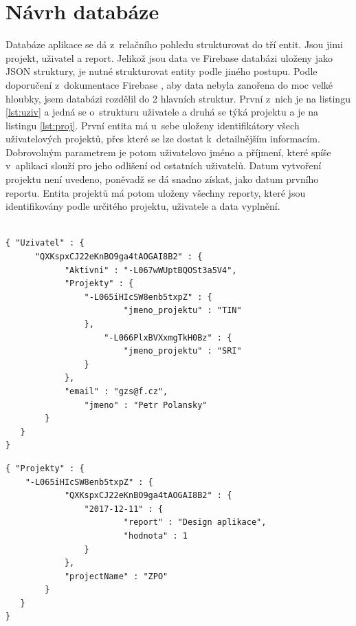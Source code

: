 \section{Návrh databáze}

Databáze aplikace se dá z~relačního pohledu strukturovat do tří entit. Jsou jimi projekt, uživatel a report. Jelikož jsou data ve Firebase databázi uloženy jako JSON struktury, je nutné strukturovat entity podle jiného postupu. Podle doporučení z~dokumentace Firebase \cite{firebase}, aby data nebyla zanořena do moc velké hloubky, jsem databázi rozdělil do 2 hlavních struktur. První z~nich je na listingu \ref{lst:uziv} a jedná se o~strukturu uživatele a druhá se týká projektu a je na listingu \ref{lst:proj}. První entita má u~sebe uloženy identifikátory všech uživatelových projektů, přes které se lze dostat k~detailnějším informacím. Dobrovolným parametrem je potom uživatelovo jméno a příjmení, které spíše v~aplikaci slouží pro jeho odlišení od ostatních uživatelů. Datum vytvoření projektu není uvedeno, poněvadž se dá snadno získat, jako datum prvního reportu. Entita projektů má potom uloženy všechny reporty, které jsou identifikovány podle určitého projektu, uživatele a data vyplnění. 

\begin{lstlisting}[frame=single, caption={Ukázka návrhu struktury dat z~Firebase databáze pro určitého uživatele. V~tomto případě má uživatel identifikátor "QXKspxCJ22eKnBO9ga4tAOGAI8B2". Snímek ukazuje, že uživatel má aktuálně aktivní projekt s~identifikátorem 
"-L067wWUptBQOSt3a5V4", pracuje na projektech "TIN"~ a "SRI".}, captionpos=b,label={lst:uziv}]

{ "Uzivatel" : {
      "QXKspxCJ22eKnBO9ga4tAOGAI8B2" : {
        	"Aktivni" : "-L067wWUptBQOSt3a5V4",
        	"Projekty" : {
          		"-L065iHIcSW8enb5txpZ" : {
            			"jmeno_projektu" : "TIN"
          		}, 
                	"-L066PlxBVXxmgTkH0Bz" : {
            			"jmeno_projektu" : "SRI"
          		}
        	},
        	"email" : "gzs@f.cz",
            	"jmeno" : "Petr Polansky"
      	}
   }   
}
\end{lstlisting}

\begin{lstlisting}[frame=single, caption={Návrh struktury uložení dat pro určitý projekt. "-L065iHIcSW8enb5txpZ"~ je identifikátor konkrétního projektu a "QXKspxCJ22eKnBO9ga4tAOGAI8B2"~ je identifikátor konkrétního uživatele. V~tomto případě uživatel do projektu s~názvem "ZPO" ~vyplnil pro den 11.12.2017 report se zprávou "Design aplikace"~ a ohodnotil se známkou 1.}, captionpos=b, label={lst:proj}]
{ "Projekty" : {
	"-L065iHIcSW8enb5txpZ" : {
        	"QXKspxCJ22eKnBO9ga4tAOGAI8B2" : {
          		"2017-12-11" : {            			
            			"report" : "Design aplikace",
            			"hodnota" : 1
          		}
        	},
        	"projectName" : "ZPO"
    	}
   }	
}
    
\end{lstlisting}

